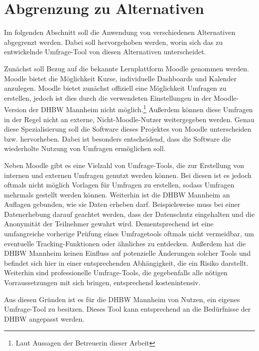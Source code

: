 \section{Abgrenzung zu Alternativen}
\label{sec:AbgrenzungZuAlternativen}

Im folgenden Abschnitt soll die Anwendung von verschiedenen Alternativen abgegrenzt werden.
Dabei soll hervorgehoben werden, worin sich das zu entwickelnde Umfrage-Tool von diesen Alternativen unterscheidet.

Zunächst soll Bezug auf die bekannte Lernplattform Moodle genommen werden.
Moodle bietet die Möglichkeit Kurse, individuelle Dashboards und Kalender anzulegen.\autocite[Vgl.][]{ms-moodle-features}
Moodle bietet zunächst offiziell eine Möglichkeit Umfragen zu erstellen, jedoch ist dies durch die verwendeten Einstellungen in der Moodle-Version der \acs{DHBW} Mannheim nicht möglich.\footnote{Laut Aussagen der Betreuerin dieser Arbeit}
Außerdem können diese Umfragen in der Regel nicht an externe, Nicht-Moodle-Nutzer weitergegeben werden.
Genau diese Spezialisierung soll die Software dieses Projektes von Moodle unterscheiden bzw. hervorheben.
Dabei ist besonders entscheidend, dass die Software die wiederholte Nutzung von Umfragen ermöglichen soll.

Neben Moodle gibt es eine Vielzahl von Umfrage-Tools, die zur Erstellung von internen und externen Umfragen genutzt werden können.
Bei diesen ist es jedoch oftmals nicht möglich Vorlagen für Umfragen zu erstellen, sodass Umfragen mehrmals gestellt werden können.
Weiterhin ist die \acs{DHBW} Mannheim an Auflagen gebunden, wie sie Daten erheben darf.
Beispielsweise muss bei einer Datenerhebung darauf geachtet werden, dass der Datenschutz eingehalten und die Anonymität der Teilnehmer gewahrt wird.
Dementsprechend ist eine umfangreiche vorherige Prüfung eines Umfragetools oftmals nicht vermeidbar, um eventuelle Tracking-Funktionen oder ähnliches zu entdecken.
Außerdem hat die \acs{DHBW} Mannheim keinen Einfluss auf potenzielle Änderungen solcher Tools und befindet sich hier in einer entsprechenden Abhängigkeit, die ein Risiko darstellt.
Weiterhin sind professionelle Umfrage-Tools, die gegebenfalls alle nötigen Vorraussetzungen mit sich bringen, entsprechend kostenintensiv.

Aus diesen Gründen ist es für die \acs{DHBW} Mannheim von Nutzen, ein eigenes Umfrage-Tool zu besitzen.
Dieses Tool kann entsprechend an die Bedürfnisse der \acs{DHBW} angepasst werden.
